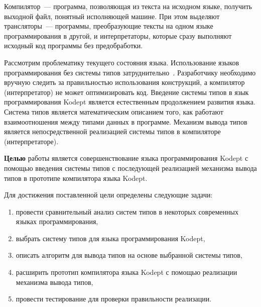 Компилятор~--- программа, позволяющая из текста на исходном языке, получить выходной файл, понятный исполняющей машине.
При этом выделяют трансляторы~--- программы, преобразующие тексты на одном языке программирования в другой, и интерпретаторы, которые сразу выполняют исходный код программы без предобработки.

Рассмотрим проблематику текущего состояния языка.
Использование языков программирования без системы типов затруднительно~\cite{Typing}.
Разработчику необходимо вручную следить за правильностью использования конструкций, а компилятор (интерпретатор) не может оптимизировать код.
Введение системы типов в язык программирования Kodept является естественным продолжением развития языка.
Система типов является математическим описанием того, как работают взаимоотношения между типами данных в программе.
Механизм вывода типов является непосредственной реализацией системы типов в компиляторе (интерпретаторе).

\textbf{Целью} работы является совершенствование языка программирования Kodept с помощью введения системы типов с последующей реализацией механизма вывода типов в прототипе компилятора языка Kodept.

Для достижения поставленной цели определены следующие задачи:

\begin{enumerate}[1)]
    \item провести сравнительный анализ систем типов в некоторых современных языках программирования,
    \item выбрать систему типов для языка программирования Kodept,
    \item описать алгоритм для вывода типов на основе выбранной системы типов,
    \item расширить прототип компилятора языка Kodept с помощью реализации механизма вывода типов,
    \item провести тестирование для проверки правильности реализации.
\end{enumerate}


